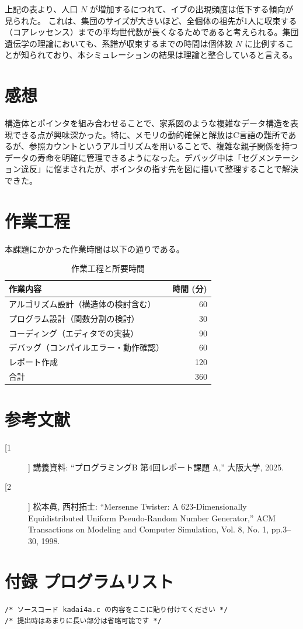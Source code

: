 \documentclass[a4paper,11pt]{jsarticle}
\begin{document}
上記の表より、人口 $N$ が増加するにつれて、イブの出現頻度は低下する傾向が見られた。
これは、集団のサイズが大きいほど、全個体の祖先が1人に収束する（コアレッセンス）までの平均世代数が長くなるためであると考えられる。集団遺伝学の理論においても、系譜が収束するまでの時間は個体数 $N$ に比例することが知られており、本シミュレーションの結果は理論と整合していると言える。

\section{感想}
構造体とポインタを組み合わせることで、家系図のような複雑なデータ構造を表現できる点が興味深かった。特に、メモリの動的確保と解放はC言語の難所であるが、参照カウントというアルゴリズムを用いることで、複雑な親子関係を持つデータの寿命を明確に管理できるようになった。デバッグ中は「セグメンテーション違反」に悩まされたが、ポインタの指す先を図に描いて整理することで解決できた。

\section{作業工程}
本課題にかかった作業時間は以下の通りである。

\begin{table}[h]
\centering
\caption{作業工程と所要時間}
\begin{tabular}{lr}
\toprule
作業内容 & 時間 (分) \\
\midrule
アルゴリズム設計（構造体の検討含む） & 60 \\
プログラム設計（関数分割の検討） & 30 \\
コーディング（エディタでの実装） & 90 \\
デバッグ（コンパイルエラー・動作確認） & 60 \\
レポート作成 & 120 \\
\midrule
合計 & 360 \\
\bottomrule
\end{tabular}
\end{table}

\section{参考文献}
% 
\begin{description}
    \item[[1]] 講義資料: ``プログラミングB 第4回レポート課題 A,'' 大阪大学, 2025.
    \item[[2]] 松本眞, 西村拓士: ``Mersenne Twister: A 623-Dimensionally Equidistributed Uniform Pseudo-Random Number Generator,'' ACM Transactions on Modeling and Computer Simulation, Vol. 8, No. 1, pp.3–30, 1998.
\end{description}

\newpage
\appendix
\section*{付録 プログラムリスト}
% 
\begin{lstlisting}[caption=kadai4a.c]
/* ソースコード kadai4a.c の内容をここに貼り付けてください */
/* 提出時はあまりに長い部分は省略可能です */
\end{lstlisting}
\end{document}
